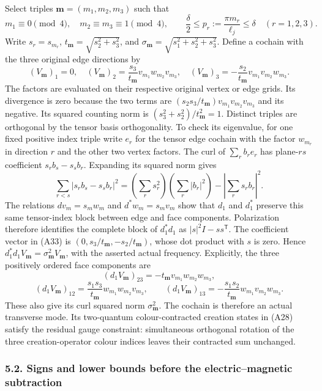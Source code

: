 \documentclass[
  11pt,
]{article}
\begin{document}
Select triples \(\mathbf m=(m_1,m_2,m_3)\) such that \[
 m_1\equiv0\pmod4,\quad m_2\equiv m_3\equiv1\pmod4,\qquad
 \frac\delta2\le p_r:=\frac{\pi m_r}{\ell_j}\le\delta
 \quad(r=1,2,3).
\tag{A32}
\] Write \(s_r=s_{m_r}\), \(t_{\mathbf m}=\sqrt{s_2^2+s_3^2}\), and
\(\sigma_{\mathbf m}=\sqrt{s_1^2+s_2^2+s_3^2}\). Define a cochain with
the three original edge directions by \[
 (V_{\mathbf m})_1=0,\quad
 (V_{\mathbf m})_2=\frac{s_3}{t_{\mathbf m}}v_{m_1}w_{m_2}v_{m_3},
 \quad
 (V_{\mathbf m})_3=-\frac{s_2}{t_{\mathbf m}}v_{m_1}v_{m_2}w_{m_3}.
\tag{A33}
\] The factors are evaluated on their respective original vertex or edge
grids. Its divergence is zero because the two terms are
\((s_2s_3/t_{\mathbf m})v_{m_1}v_{m_2}v_{m_3}\) and its negative. Its
squared counting norm is \((s_3^2+s_2^2)/t_{\mathbf m}^2=1\). Distinct
triples are orthogonal by the tensor basis orthogonality. To check its
eigenvalue, for one fixed positive index triple write \(e_r\) for the
tensor edge cochain with the factor \(w_{m_r}\) in direction \(r\) and
the other two vertex factors. The curl of \(\sum_rb_re_r\) has
plane-\(rs\) coefficient \(s_rb_s-s_sb_r\). Expanding its squared norm
gives \[
 \sum_{r<s}|s_rb_s-s_sb_r|^2
 =\left(\sum_rs_r^2\right)\left(\sum_r|b_r|^2\right)
                       -\left|\sum_rs_rb_r\right|^2.
\tag{A33a}
\] The relations \(dv_m=s_mw_m\) and \(d^*w_m=s_mv_m\) show that \(d_1\)
and \(d_1^*\) preserve this same tensor-index block between edge and
face components. Polarization therefore identifies the complete block of
\(d_1^*d_1\) as \(|s|^2I-ss^{\mathsf T}\). The coefficient vector in
(A33) is \((0,s_3/t_{\mathbf m},-s_2/t_{\mathbf m})\), whose dot product
with \(s\) is zero. Hence
\(d_1^*d_1V_{\mathbf m}=\sigma_{\mathbf m}^2V_{\mathbf m}\), with the
asserted actual frequency. Explicitly, the three positively ordered face
components are \[
 (d_1V_{\mathbf m})_{23}=-t_{\mathbf m}v_{m_1}w_{m_2}w_{m_3},
\] \[
 (d_1V_{\mathbf m})_{12}=\frac{s_1s_3}{t_{\mathbf m}}w_{m_1}w_{m_2}v_{m_3},
 \qquad
 (d_1V_{\mathbf m})_{13}=-\frac{s_1s_2}{t_{\mathbf m}}w_{m_1}v_{m_2}w_{m_3}.
\tag{A34}
\] These also give its curl squared norm \(\sigma_{\mathbf m}^2\). The
cochain is therefore an actual transverse mode. Its two-quantum
colour-contracted creation states in (A28) satisfy the residual gauge
constraint: simultaneous orthogonal rotation of the three
creation-operator colour indices leaves their contracted sum unchanged.

\subsubsection{5.2. Signs and lower bounds before the electric--magnetic
subtraction}\label{weak-coupling-part-10-signs-and-lower-bounds-before-the-electricmagnetic-subtraction}
\end{document}
